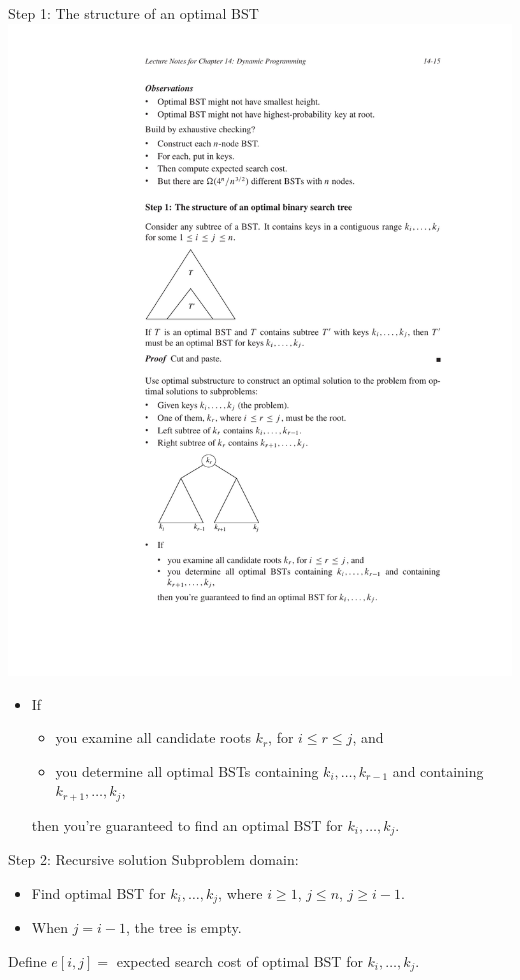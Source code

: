 \documentclass{beamer}
\begin{document}
\begin{frame}{Step 1: The structure of an optimal BST}
    \includegraphics[width=\textwidth, trim={4cm 6cm 4cm 18.25cm}, clip]{figures/BST_step1}
    \begin{itemize}
        \item If
            \begin{itemize}
                \item you examine all candidate roots $k_r$, for $i \leq r \leq j$, and
                \item you determine all optimal BSTs containing $k_i, \ldots, k_{r-1}$ and containing $k_{r+1}, \ldots, k_j$,
            \end{itemize}
        then you're guaranteed to ﬁnd an optimal BST for $k_i, \ldots, k_j$.
    \end{itemize}
\end{frame}

\begin{frame}{Step 2: Recursive solution}
    Subproblem domain:
    \begin{itemize}
        \item Find optimal BST for $k_i, \ldots, k_j$, where $i \geq 1$, $j \leq n$, $j \geq i - 1$.
        \item When $j = i - 1$, the tree is empty.
    \end{itemize}
    Define $e[i, j] = $ expected search cost of optimal BST for $k_i, \dots, k_j$.
\end{frame}
\end{document}
